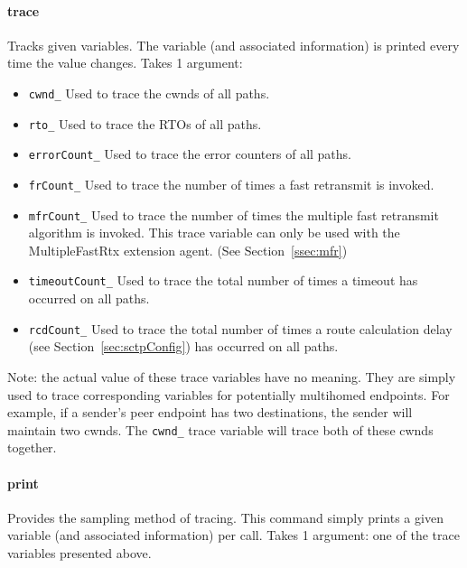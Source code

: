 	 \paragraph{trace} Tracks given variables. The variable (and associated
	 information) is printed every time the value changes. Takes 1
	 argument:
	    \begin{itemize}

	       \item[] {\tt cwnd\_} Used to trace the cwnds of all
	       paths. 

	       \item[] {\tt rto\_} Used to trace the RTOs of all paths.

	       \item[] {\tt errorCount\_} Used to trace the error counters
	       of all paths.

	       \item[] {\tt frCount\_} Used to trace the number of times a
	       fast retransmit is invoked.

	       \item[] {\tt mfrCount\_} Used to trace the number of times
	       the multiple fast retransmit algorithm is invoked. This
	       trace variable can only be used with the MultipleFastRtx
	       extension agent. (See Section~\ref{ssec:mfr})

	       \item[] {\tt timeoutCount\_} Used to trace the total number of
	       times a timeout has occurred on all paths.

	       \item[] {\tt rcdCount\_} Used to trace the total number of
	       times a route calculation delay (see
	       Section~\ref{sec:sctpConfig}) has occurred on all paths.

	    \end{itemize}
	 Note: the actual value of these trace variables have no
	 meaning. They are simply used to trace corresponding variables
	 for potentially multihomed endpoints. For example, if a sender's
	 peer endpoint has two destinations, the sender will maintain two
	 cwnds. The {\tt cwnd\_} trace variable will trace both of these
	 cwnds together.

	 \paragraph{print} Provides the sampling method of tracing. This
	 command simply prints a given variable (and associated
	 information) per call.  Takes 1 argument: one of the trace
	 variables presented above.

